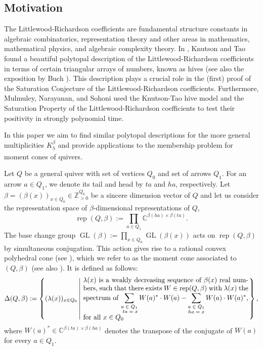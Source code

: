 \documentclass[11pt]{article}
\theoremstyle{definition}
\numberwithin{equation}{section}
\newcommand{\pctext}[2]{\text{\parbox{#1}{#2}}}
\newcommand{\rep}{\operatorname{rep}}
\newcommand{\GL}{\operatorname{GL}}
\newcommand{\ZZ}{\mathbb Z}
\newcommand{\CC}{\mathbb C}
\newcommand{\unlm}{\underline{\lambda}}
\newcommand{\lm}{\lambda}
\begin{document}
\subsection{Motivation}
The Littlewood-Richardson coefficients are fundamental structure constants in algebraic combinatorics, representation theory and other areas in mathematics, mathematical physics, and algebraic complexity theory. In \cite{KT}, Knutson and Tao found a beautiful polytopal description of the Littlewood-Richardson coefficients in terms of certain triangular arrays of numbers, known as hives (see also the exposition by Buch \cite{Buch-2000}). This description plays a crucial role in the (first) proof of the Saturation Conjecture of the Littlewood-Richardson coefficients. Furthermore, Mulmuley, Narayanan, and Sohoni \cite{MNS} used the Knutson-Tao hive model and the Saturation Property of the Littlewood-Richardson coefficients to test their positivity in strongly polynomial time.

In this paper we aim to find similar polytopal descriptions for the more general multiplicities $K^{\beta}_{\unlm}$ and provide applications to the membership problem for moment cones of quivers.

Let $Q$ be a general quiver with set of vertices $Q_0$ and set of arrows $Q_1$. For an arrow $a \in Q_1$, we denote its tail and head by $ta$ and $ha$, respectively. Let $\beta=(\beta(x))_{x \in Q_0} \in \ZZ_{>0}^{Q_0}$ be a sincere dimension vector of $Q$ and let us consider the representation space of $\beta$-dimensional representations of $Q$,
$$
\rep(Q, \beta):=\prod_{a \in Q_1} \CC^{\beta(ha) \times \beta(ta)}.
$$ 
The base change group $\GL(\beta):=\prod_{x \in Q_0} \GL(\beta(x))$ acts on $\rep(Q, \beta)$ by simultaneous conjugation. This action gives rise to a rational convex polyhedral cone (see \cite{Sj}), which we refer to as the moment cone associated to $(Q, \beta)$ (see also \cite{CC4}). It is defined as follows: 
\[
\Delta(Q, \beta):= \left \{(\lm(x))_{x \in Q_0} \left \vert\ \pctext{3.35in}{$\lm(x)$ is a weakly decreasing sequence of $\beta(x)$ real numbers, such that there exists $W \in \rep(Q, \beta)$ with $\lm(x)$ the spectrum of $\sum_{\substack{\text{$a \in Q_1$}\\ \text{ $ta = x$}} } W(a)^* \cdot W(a) - \sum_{\substack{\text{$a \in Q_1$} \\ \text{$ha = x$}}} W(a) \cdot W(a)^*,$ for all $x \in Q_0$} \right. \right \},
\] 
where $W(a)^* \in \CC^{\beta(ta)\times \beta(ha)}$ denotes the transpose of the conjugate of $W(a)$ for every $a \in Q_1$.
\end{document}
